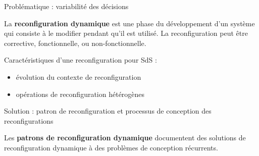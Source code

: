 \begin{frame}{Problématique : variabilité des décisions}
\begin{block}{}
La \textbf{reconfiguration dynamique} est une phase du
développement d'un système qui consiste à le modifier pendant qu’il est
utilisé. La reconfiguration peut être corrective, fonctionnelle,  ou
non-fonctionnelle.
\end{block}
\begin{figure}

\end{figure}

Caractéristiques d'une reconfiguration pour SdS : 
\begin{itemize}
\item évolution du contexte de reconfiguration
\item opérations de reconfiguration hétérogènes
\end{itemize}
\end{frame}
%
\begin{frame}{Solution : patron de reconfiguration et processus de
conception des reconfigurations}
\begin{figure}

\end{figure}
\begin{block}{}
Les \textbf{patrons de reconfiguration dynamique} documentent des solutions de
reconfiguration dynamique à des problèmes de conception récurrents.
\end{block}
\end{frame}


